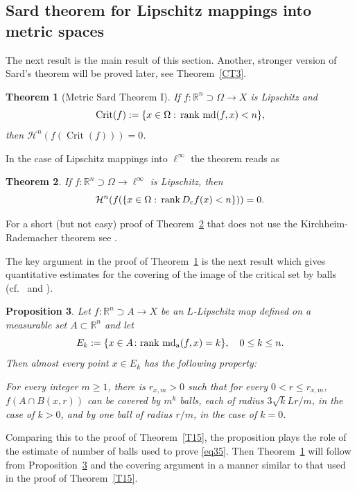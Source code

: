 \documentclass[12pt,leqno]{amsart}
\newtheorem{theorem}{Theorem}
\newtheorem{proposition}[theorem]{Proposition}
\theoremstyle{definition}
\newcommand{\bbbr}{\mathbb R}
\def\H{{\mathcal H}}
\def\rank{{\rm rank\,}}
\def\md{\operatorname{md}}
\def\apmd{\operatorname{md_{\rm a}}}
\numberwithin{theorem}{section} \numberwithin{equation}{section}
\begin{document}
\subsection{Sard theorem for Lipschitz mappings into metric spaces}
The next result is the main result of this section. Another, stronger version of Sard's theorem will be proved later, see Theorem~\ref{CT3}.
\begin{theorem}[Metric Sard Theorem I]
\label{T17}
If $f:\mathbb{R}^n\supset\Omega\to X$ is Lipschitz and
$$
\operatorname{Crit}(f):=\{x\in\Omega:\, \rank\md (f,x)<n\},
$$
then $\mathcal{H}^n(f(\operatorname{Crit}(f)))=0$.
\end{theorem}
In the case of Lipschitz mappings into $\ell^\infty$ the theorem reads as
\begin{theorem}
\label{T18}
If $f:\bbbr^n\supset\Omega\to\ell^\infty$ is Lipschitz, then
$$
\H^n(f(\{x\in\Omega:\, \rank D_{\rm c}f(x)<n\}))=0.
$$
\end{theorem}
For a short (but not easy) proof of Theorem~\ref{T18} that does not use the Kirchheim-Rademacher theorem see \cite[Theorem~2.2]{hajlaszma}.

The key argument in the proof of Theorem~\ref{T17}
is the next result which gives quantitative estimates for the covering of the image of the critical set by balls
(cf.\ \cite[Lemma~2.7]{hajlaszma} and \cite[Lemma~3.7]{HZ}).

\begin{proposition}
\label{T14}
Let $f:\bbbr^n\supset A \to X$ be an $L$-Lipschitz map defined on a measurable set $A\subset \bbbr^n$ and let
\begin{equation}
\label{eq37}
E_k:=\{x\in A\colon \rank\apmd(f,x)=k\},
\quad
0\leq k\leq n.
\end{equation}
Then almost every point $x\in E_k$ has the following property:

For every integer $m\geq 1$, there is $r_{x,m}>0$ such that for every $0<r\leq r_{x,m}$,  $f(A\cap B(x,r))$ can be covered by $m^k$ balls, each of radius
$3\sqrt{k}Lr/m$, in the case of $k>0$, and by one ball of radius $r/m$, in the case of $k=0$.
\end{proposition}
Comparing this to the proof of Theorem~\ref{T15},
the proposition plays the role of the estimate of number of balls used to prove
\eqref{eq35}. Then Theorem~\ref{T17} will follow from Proposition~\ref{T14} and the covering argument in a manner similar to that used in the proof of Theorem~\ref{T15}.
\end{document}
